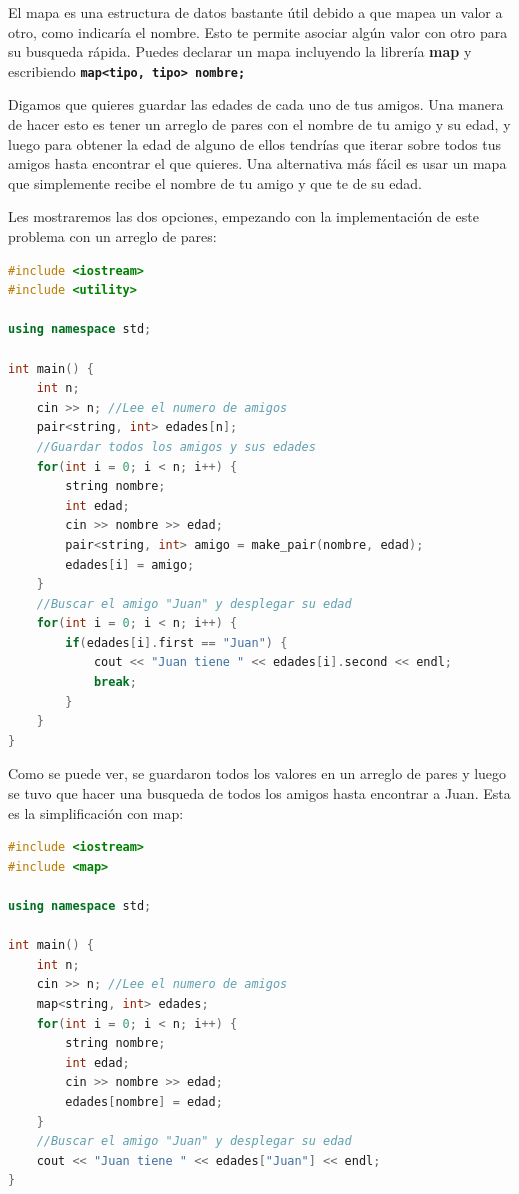 \documentclass{article}
\begin{document}
El mapa es una estructura de datos bastante útil debido a que mapea un valor a otro, como indicaría el nombre. Esto te permite asociar algún valor con otro para su busqueda rápida. Puedes declarar un mapa incluyendo la librería \textbf{map} y escribiendo \textbf{\lstinline{map<tipo, tipo> nombre;}}

Digamos que quieres guardar las edades de cada uno de tus amigos. Una manera de hacer esto es tener un arreglo de pares con el nombre de tu amigo y su edad, y luego para obtener la edad de alguno de ellos tendrías que iterar sobre todos tus amigos hasta encontrar el que quieres. Una alternativa más fácil es usar un mapa que simplemente recibe el nombre de tu amigo y que te de su edad.

Les mostraremos las dos opciones, empezando con la implementación de este problema con un arreglo de pares:

\begin{lstlisting}[language=C++, title=Implementación con pares]
#include <iostream>
#include <utility>

using namespace std;

int main() {
	int n;
	cin >> n; //Lee el numero de amigos
	pair<string, int> edades[n];
	//Guardar todos los amigos y sus edades
	for(int i = 0; i < n; i++) {
		string nombre;
		int edad;
		cin >> nombre >> edad;
		pair<string, int> amigo = make_pair(nombre, edad);
		edades[i] = amigo;
	}
	//Buscar el amigo "Juan" y desplegar su edad
	for(int i = 0; i < n; i++) {
		if(edades[i].first == "Juan") {
			cout << "Juan tiene " << edades[i].second << endl;
			break;
		}
	}
}
\end{lstlisting}

Como se puede ver, se guardaron todos los valores en un arreglo de pares y luego se tuvo que hacer una busqueda de todos los amigos hasta encontrar a Juan. Esta es la simplificación con map:

\begin{lstlisting}[language=C++, title=Implementación con map]
#include <iostream>
#include <map>

using namespace std;

int main() {
	int n;
	cin >> n; //Lee el numero de amigos
	map<string, int> edades;
	for(int i = 0; i < n; i++) {
		string nombre;
		int edad;
		cin >> nombre >> edad;
		edades[nombre] = edad;
	}
	//Buscar el amigo "Juan" y desplegar su edad
	cout << "Juan tiene " << edades["Juan"] << endl;
}
\end{lstlisting}
\end{document}
